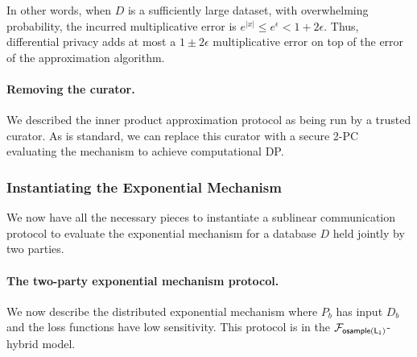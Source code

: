 In other words, when $D$ is a sufficiently large dataset, with
overwhelming probability, the incurred multiplicative error is $e^{|x|}
\le e^{\epsilon} < 1+2\epsilon$. Thus, differential privacy adds at most
a $1 \pm 2\epsilon$ multiplicative error on top of the error of the
approximation algorithm.

\paragraph{Removing the curator.}
We described the inner product approximation protocol as being run by a
trusted curator.  As is standard, we can replace this curator with a
secure 2-PC evaluating the mechanism to achieve computational DP. 

\subsubsection{Instantiating the Exponential Mechanism}
We now have all the necessary pieces to instantiate a sublinear
communication protocol to evaluate the exponential mechanism for a
database $D$ held jointly by two parties.

\paragraph{The two-party exponential mechanism protocol.}
We now describe the distributed exponential mechanism where $P_b$ has
input $D_b$ and the loss functions have low sensitivity.  This protocol
is in the $\mathcal{F}_{\mathsf{osample(L_1)}}$-hybrid model.

